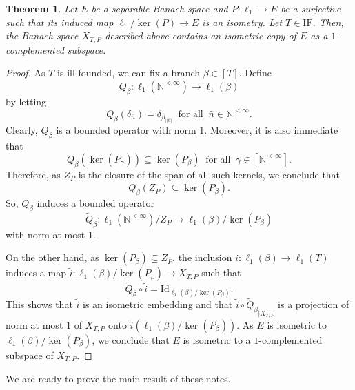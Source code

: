 \documentclass[letterpaper]{amsart}
\numberwithin{equation}{section}
\newtheorem{theorem}{Theorem}[section]
\theoremstyle{definition}
\newcommand{\N}{{\mathbb{N}}}
\newcommand{\IF}{\mathrm{IF}}
\begin{document}
 









 

\begin{theorem}\label{ThmIFnotAP}
 Let $E$ be a separable Banach space and $P\colon \ell_1\to E$ be a surjective  such that its induced map $\ell_1/\ker(P)\to E$ is an isometry.  Let $T\in \IF$. Then, the Banach space $X_{T,P}$ described above contains an isometric copy of $E$ as a $1$-complemented subspace.
\end{theorem}
 

\begin{proof}
As $T$ is ill-founded, we can fix a branch $\beta\in [T]$. Define 
\[Q_\beta\colon \ell_1({\N^{<\infty}})\to \ell_1(\beta)\]
by letting 
\[Q_\beta(\delta_{\bar n})=\delta_{\beta_{||\bar n|}} \ \text{ for all }\ \bar n\in \N^{<\infty}.\]
Clearly, $Q_\beta$ is a bounded operator with norm  $1$. Moreover, it is also immediate that 
\[Q_\beta(\ker(P_\gamma))\subseteq \ker( P_\beta)\ \text{ for all }\ \gamma\in \left[\N^{<\infty}\right].\]
Therefore, as $Z_P$ is the closure of the span of all such kernels, we conclude that \[Q_\beta(Z_P)\subseteq \ker(P_\beta).\]
So,  $Q_\beta$ induces a bounded operator 
\[\tilde Q_\beta\colon \ell_1(\N^{<\infty})/Z_P\to \ell_1(\beta)/\ker(P_\beta)\]
with norm at most $1$.

On the other hand, as $\ker(P_\beta)\subseteq Z_P$,  the inclusion  $i\colon \ell_1(\beta)\to \ell_1(T)$ 
 induces a map 
$\tilde i\colon \ell_1(\beta)/\ker(P_\beta)\to X_{T,P}$
such that 
\[\tilde Q_\beta\circ \tilde i=\mathrm{Id}_{\ell_1(\beta)/\ker(P_\beta)}.\]
This shows that $\tilde i$ is an isometric embedding and that 
${\tilde i\circ   \tilde{Q}_{\beta}}_{|X_{T,P}}$ is a projection of norm at most $1$ of $X_{T,P}$ onto $\tilde i(\ell_1(\beta)/\ker(P_\beta))$.  As $E$ is isometric to  $\ell_1(\beta)/\ker(P_\beta)$, we conclude that $E$   is isometric to  a $1$-complemented  subspace of $X_{T,P}$.
\end{proof}



We are ready to prove the main result of these notes.
\end{document}
